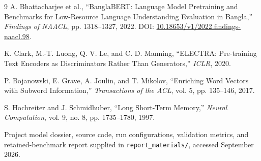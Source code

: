 \documentclass[11pt,a4paper]{article}
\begin{document}
\small
\begin{thebibliography}{9}
\setlength{\itemsep}{3pt}
 A. Bhattacharjee et al., ``BanglaBERT: Language Model Pretraining and Benchmarks for Low-Resource Language Understanding Evaluation in Bangla,'' \textit{Findings of NAACL}, pp. 1318--1327, 2022. DOI: \href{https://doi.org/10.18653/v1/2022.findings-naacl.98}{10.18653/v1/2022.findings-naacl.98}.

 K. Clark, M.-T. Luong, Q. V. Le, and C. D. Manning, ``ELECTRA: Pre-training Text Encoders as Discriminators Rather Than Generators,'' \textit{ICLR}, 2020.

 P. Bojanowski, E. Grave, A. Joulin, and T. Mikolov, ``Enriching Word Vectors with Subword Information,'' \textit{Transactions of the ACL}, vol. 5, pp. 135--146, 2017.

 S. Hochreiter and J. Schmidhuber, ``Long Short-Term Memory,'' \textit{Neural Computation}, vol. 9, no. 8, pp. 1735--1780, 1997.

 Project model dossier, source code, run configurations, validation metrics, and retained-benchmark report supplied in \texttt{report\_materials/}, accessed September 2026.
\end{thebibliography}
\end{document}
